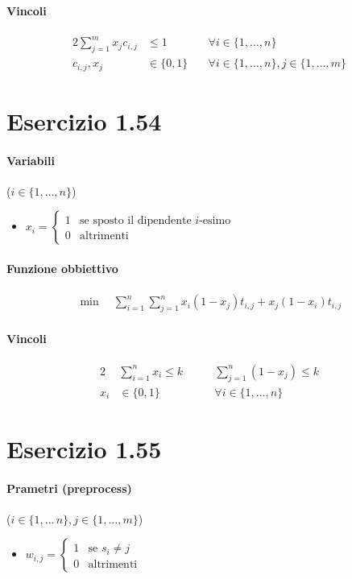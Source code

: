 \documentclass{article}
\begin{document}
\paragraph{Vincoli}
\begin{alignat}{2}
  \sum_{j=1}^m x_j c_{i,j} &\leq 1 &\forall i \in \{1,\ldots,n\}\\
  c_{i,j}, x_j &\in \{0,1\} \quad &\forall i \in \{1,\ldots,n\}, j \in \{1,\ldots,m\}
\end{alignat}

\pagebreak
\section{Esercizio 1.54}

\paragraph{Variabili} ($i \in \{1,\ldots,n\}$)
\begin{itemize}
  \item $x_i = \begin{cases}
    1 &\text{se sposto il dipendente }i\text{-esimo}\\
    0 &\text{altrimenti}
  \end{cases}$
\end{itemize}

\paragraph{Funzione obbiettivo}
\begin{align*}
  \min \quad \sum_{i=1}^n \sum_{j=1}^n x_i (1-x_j) t_{i,j} + x_j (1-x_i) t_{i,j}
\end{align*}

\paragraph{Vincoli}
\begin{alignat}{2}
  &\sum_{i=1}^n x_i \leq k \qquad &\sum_{j=1}^n (1-x_{j}) \leq k \\
  x_i &\in \{0,1\} \quad &\forall i \in \{1,\ldots,n\}
\end{alignat}

\pagebreak
\section{Esercizio 1.55}

\paragraph{Prametri (preprocess)} ($i \in \{1,\ldots\,n\}, j \in \{1,\ldots,m\}$)
\begin{itemize}
  \item $w_{i,j} = \begin{cases}
      1 & \text{se }s_i \neq j \\
      0 & \text{altrimenti}
  \end{cases}$
\end{itemize}
\end{document}
